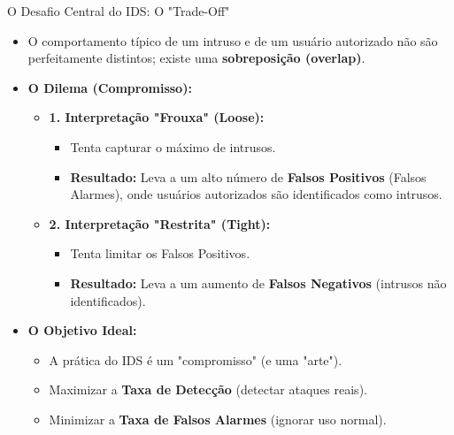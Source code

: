 \begin{frame}{O Desafio Central do IDS: O "Trade-Off"}
    \begin{itemize}
        \item O comportamento típico de um intruso e de um usuário autorizado não são perfeitamente distintos; existe uma \textbf{sobreposição (overlap)}.

        \item \textbf{O Dilema (Compromisso):}
              \begin{itemize}
                  \item \textbf{1. Interpretação "Frouxa" (Loose):}
                        \begin{itemize}
                            \item Tenta capturar o máximo de intrusos.
                            \item \textbf{Resultado:} Leva a um alto número de \textbf{Falsos Positivos} (Falsos Alarmes), onde usuários autorizados são identificados como intrusos.
                        \end{itemize}
                  \item \textbf{2. Interpretação "Restrita" (Tight):}
                        \begin{itemize}
                            \item Tenta limitar os Falsos Positivos.
                            \item \textbf{Resultado:} Leva a um aumento de \textbf{Falsos Negativos} (intrusos não identificados).
                        \end{itemize}
              \end{itemize}

        \item \textbf{O Objetivo Ideal:}
              \begin{itemize}
                  \item A prática do IDS é um "compromisso" (e uma "arte").
                  \item Maximizar a \textbf{Taxa de Detecção} (detectar ataques reais).
                  \item Minimizar a \textbf{Taxa de Falsos Alarmes} (ignorar uso normal).
              \end{itemize}
    \end{itemize}
\end{frame}

